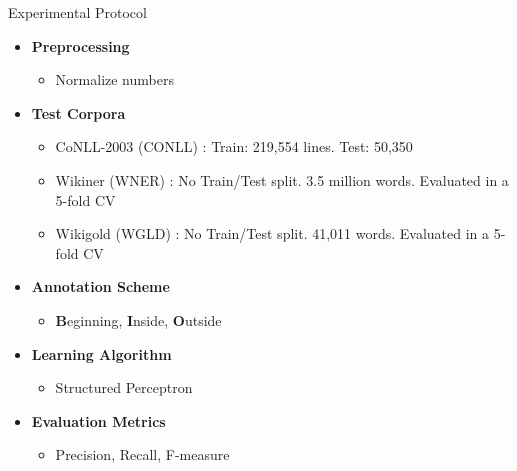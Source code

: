 \documentclass[10pt,xcolor=table]{beamer}
\newcommand\mlex{M^{\scriptscriptstyle L}}
\newcommand\msyn{M^{\scriptscriptstyle S}}
\newcommand\mstd{M^{\scriptscriptstyle T}}
\begin{document}
\begin{frame}{Experimental Protocol}
	\begin{itemize}[<+- | alert@+>]
		\item \large \textbf{Preprocessing}
			\begin{itemize}
				\item Normalize numbers
			\end{itemize}
		\item \textbf{Test Corpora}
			\begin{itemize}
			\item CoNLL-2003 (CONLL) \cite{SangM03}: Train: 219,554 lines. Test: 50,350 
			\item Wikiner (WNER) \cite{Nothman2009}: No Train/Test split. 3.5 million words. Evaluated in a 5-fold CV
			\item Wikigold (WGLD) \cite{Balasuriya2009}: No Train/Test split. 41,011 words. Evaluated in a 5-fold CV
			\end{itemize}
		\item \textbf{Annotation Scheme}
			\begin{itemize}
				\item \textbf{B}eginning, \textbf{I}nside, \textbf{O}utside
			\end{itemize}
		\item \textbf{Learning Algorithm}
			\begin{itemize}
				\item Structured Perceptron \cite{Collins2002}
			\end{itemize}

		\item \textbf{Evaluation Metrics}
			\begin{itemize}
				\item Precision, Recall, F-measure
			\end{itemize}
	\end{itemize}	 
	\vspace{\textheight}
\end{frame}

\end{document}
